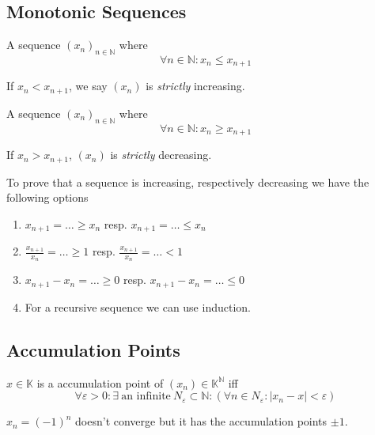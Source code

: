 \subsection{Monotonic Sequences}
\begin{definition}
   A sequence \((x_n)_{n \in \mathbb{N}}\) where
   \[\forall n \in \mathbb{N}: x_n \leq x_{n+1}\]
\end{definition}
\begin{remark}
   If \(x_n < x_{n+1}\), we say \((x_n)\) is \emph{strictly} increasing.
\end{remark}

\begin{definition}
   A sequence \((x_n)_{n \in \mathbb{N}}\) where
   \[\forall n \in \mathbb{N}: x_n \geq x_{n+1}\]
\end{definition}
\begin{remark}
   If \(x_n > x_{n+1}\), \((x_n)\) is \emph{strictly} decreasing.
\end{remark}

\begin{remark}
   To prove that a sequence is increasing, respectively decreasing we have the following options
   \begin{enumerate}
      \item \(x_{n+1} = \ldots \geq x_n\) resp. \(x_{n+1} = \ldots \leq x_n\)
      \item \(\frac{x_{n+1}}{x_n} = \ldots \geq 1\) resp. \(\frac{x_{n+1}}{x_n} = \ldots < 1\)
      \item \(x_{n+1} - x_n = \ldots \geq 0\) resp. \(x_{n+1} - x_n = \ldots \leq 0\)
      \item For a recursive sequence we can use induction.
   \end{enumerate}
\end{remark}

\subsection{Accumulation Points}
\begin{definition}
   \(x \in \mathbb{K}\) is a accumulation point of \((x_n) \in \mathbb{K}^\mathbb{N}\) iff
   \[\forall \varepsilon > 0: \exists~\text{an infinite}~N_{\varepsilon} \subset \mathbb{N}: (\forall n \in N_\varepsilon: |x_n - x| < \varepsilon)\]
\end{definition}
\begin{example}
   \(x_n = (-1)^n\) doesn't converge but it has the accumulation points \(\pm 1\).
\end{example}

